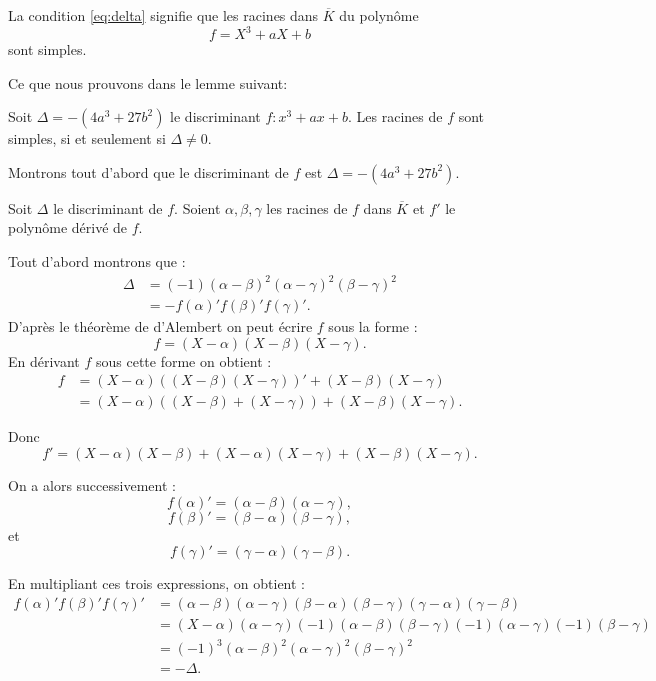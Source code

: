 La condition \eqref{eq:delta} signifie que les racines dans $\overline{K}$ du polynôme
\[
f=X^3+aX+b
\] 
sont simples.

Ce que nous prouvons dans le lemme suivant:

\begin{lemme}
    \label{lem:lemme1}
    Soit $\Delta= -(4a^3 + 27b^2)$ le discriminant $f : x^3 + ax + b$. 
    Les racines de $f$ sont simples, si et seulement si $\Delta \neq 0$.
\end{lemme}

\begin{demonstration}
    Montrons tout d'abord que le discriminant de $f$ est $\Delta= -(4a^3 + 27b^2)$.

    Soit $\Delta$ le discriminant de $f$. Soient $\alpha, \beta, \gamma $ les racines de $f$ dans $\overline{K}$ et $f'$ le polynôme dérivé de $f$.

    Tout d'abord montrons que :
    \begin{align*}
        \Delta &= (-1) ( \alpha - \beta )^2 ( \alpha - \gamma )^2 ( \beta - \gamma )^2 \\
          &= - f(\alpha)'f(\beta )'f(\gamma)'
    .\end{align*}
    D'après le théorème de d'Alembert on peut écrire $f$ sous la forme :
    \[
        f = \left( X - \alpha \right) \left( X - \beta \right) \left( X - \gamma \right) 
    .\] 
    En dérivant $f$ sous cette forme on obtient :
    \begin{align*}
        f &= ( X - \alpha ) \left( ( X - \beta ) ( X - \gamma ) \right)'  + ( X - \beta ) ( X - \gamma )\\
          &= ( X - \alpha ) \left( ( X - \beta ) + ( X - \gamma ) \right) + ( X - \beta ) ( X - \gamma ) 
    .\end{align*}

    Donc  
\[
f' = ( X - \alpha ) ( X - \beta ) + ( X - \alpha ) ( X - \gamma ) + ( X - \beta ) ( X - \gamma )
.\] 

On a alors successivement : 
\[
    f(\alpha)' = ( \alpha - \beta) ( \alpha - \gamma )
,\] 
\[
f(\beta )' = ( \beta - \alpha) ( \beta - \gamma)
,\] 
et
\[
f(\gamma)' = ( \gamma - \alpha) ( \gamma - \beta)
.\] 

En multipliant ces trois expressions, on obtient :
\begin{align*}
    f(\alpha)' f(\beta )' f(\gamma)' &= ( \alpha - \beta ) ( \alpha - \gamma ) ( \beta - \alpha ) ( \beta - \gamma) ( \gamma - \alpha ) ( \gamma - \beta ) \\
&= \left( X - \alpha \right) \left( \alpha - \gamma \right) \left( -1 \right) \left( \alpha - \beta  \right) \left( \beta - \gamma \right) \left( -1 \right) \left( \alpha - \gamma \right) \left( -1 \right) \left( \beta - \gamma \right) \\
&= \left( -1 \right) ^3 \left( \alpha - \beta  \right) ^2 \left( \alpha - \gamma  \right) ^2 \left( \beta - \gamma \right) ^2\\
 &= - \Delta
.\end{align*}


\end{demonstration}
